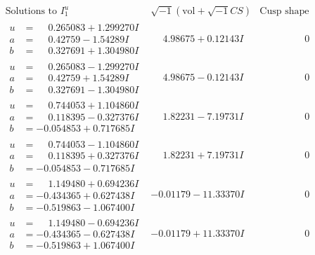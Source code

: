 \documentclass[1p]{elsarticle_modified}
\theoremstyle{definition}
\newcommand{\I}{\sqrt{-1}}
\begin{document}
$$\begin{array}{c|c|c}
\text{Solutions to }I^u_{1}& \I (\text{vol} + \sqrt{-1}CS) & \text{Cusp shape}\\
 \hline 
\begin{aligned}
u &= \phantom{-}0.265083 + 1.299270 I \\
a &= \phantom{-}0.42759 - 1.54289 I \\
b &= \phantom{-}0.327691 + 1.304980 I\end{aligned}
 & \phantom{-}4.98675 + 0.12143 I & \phantom{-0.000000 } 0 \\ \hline\begin{aligned}
u &= \phantom{-}0.265083 - 1.299270 I \\
a &= \phantom{-}0.42759 + 1.54289 I \\
b &= \phantom{-}0.327691 - 1.304980 I\end{aligned}
 & \phantom{-}4.98675 - 0.12143 I & \phantom{-0.000000 } 0 \\ \hline\begin{aligned}
u &= \phantom{-}0.744053 + 1.104860 I \\
a &= \phantom{-}0.118395 - 0.327376 I \\
b &= -0.054853 + 0.717685 I\end{aligned}
 & \phantom{-}1.82231 - 7.19731 I & \phantom{-0.000000 } 0 \\ \hline\begin{aligned}
u &= \phantom{-}0.744053 - 1.104860 I \\
a &= \phantom{-}0.118395 + 0.327376 I \\
b &= -0.054853 - 0.717685 I\end{aligned}
 & \phantom{-}1.82231 + 7.19731 I & \phantom{-0.000000 } 0 \\ \hline\begin{aligned}
u &= \phantom{-}1.149480 + 0.694236 I \\
a &= -0.434365 + 0.627438 I \\
b &= -0.519863 - 1.067400 I\end{aligned}
 & -0.01179 - 11.33370 I & \phantom{-0.000000 } 0 \\ \hline\begin{aligned}
u &= \phantom{-}1.149480 - 0.694236 I \\
a &= -0.434365 - 0.627438 I \\
b &= -0.519863 + 1.067400 I\end{aligned}
 & -0.01179 + 11.33370 I & \phantom{-0.000000 } 0 \\ \hline\begin{aligned}

\end{aligned}
\end{array}$$
\end{document}
